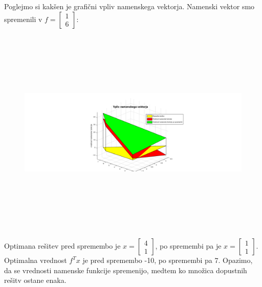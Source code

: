 \documentclass[a4paper,12pt]{article}
\begin{document}
\clearpage

Poglejmo si kakšen je grafični vpliv namenskega vektorja. Namenski vektor smo spremenili v $f=\begin{bmatrix} 1 \\ 6\end{bmatrix}$:

\begin{figure}[h!]
\includegraphics[width=20cm,height=10cm]{viz2.png}
\centering
\end{figure}

Optimana rešitev pred spremembo je $x=\begin{bmatrix} 4\\ 1\end{bmatrix}$, po spremembi pa je $x=\begin{bmatrix} 1 \\ 1 \end{bmatrix}$. Optimalna vrednost $f^Tx$ je pred spremembo -10, po spremembi pa 7.
Opazimo, da se vrednosti namenske funkcije spremenijo, medtem ko množica dopustnih rešitv ostane enaka.
\end{document}
